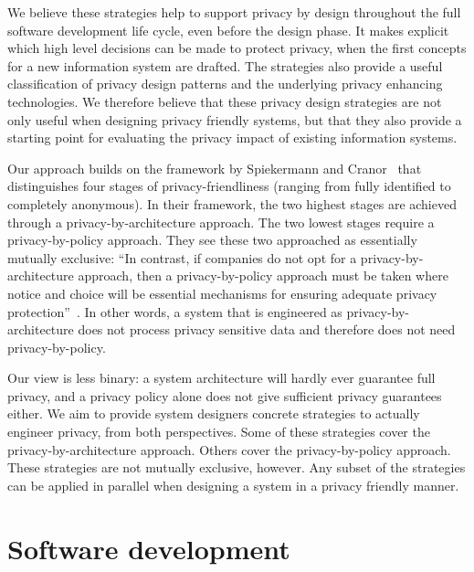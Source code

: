 We believe these strategies help to support privacy by design throughout the full software development life cycle, even before the design phase. It makes explicit which high level decisions can be made to protect privacy, when the first concepts for a new information system are drafted. 
The strategies also provide a useful classification of privacy design patterns and the underlying privacy enhancing technologies. 
We therefore believe that these privacy design strategies are not only useful when designing privacy friendly systems, but that they also provide a starting point for evaluating the privacy impact of existing information systems. 


Our approach builds on the framework by Spiekermann and Cranor~\cite{DBLP:journals/tse/SpiekermannC09} that distinguishes four stages of privacy-friendliness (ranging from fully identified to completely anonymous). In their framework, the two highest stages are achieved through a privacy-by-architecture approach. The two lowest stages require
a privacy-by-policy approach. They see these two approached as essentially mutually exclusive: ``In contrast, if companies do not opt for a
privacy-by-architecture approach, then a privacy-by-policy approach must be taken where notice and choice will be essential mechanisms for ensuring adequate privacy protection''~\cite{DBLP:journals/tse/SpiekermannC09}. In other words, a system that is engineered as privacy-by-architecture does not process privacy sensitive data and therefore does not need privacy-by-policy.

Our view is less binary: a system architecture will hardly ever guarantee full privacy, and a privacy policy alone does not give sufficient privacy guarantees either. We aim to provide system designers concrete strategies to actually engineer privacy, from both perspectives. Some of these strategies cover the privacy-by-architecture approach. Others cover the privacy-by-policy approach. These strategies are not mutually exclusive, however. Any subset of the strategies can be applied in parallel when designing a system in a privacy friendly manner. 



\section{Software development}
\label{sec-development}


